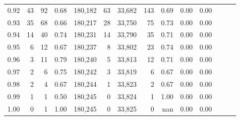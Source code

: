 \begin{tabular}{rrrrrrrrrrrrrr}
0.92 &     43 &   92 &  0.68 &  180,182 &       63 &  33,682 &     143 &  0.69 &  0.00 &      0.00 \\
0.93 &     35 &   68 &  0.66 &  180,217 &       28 &  33,750 &      75 &  0.73 &  0.00 &      0.00 \\
0.94 &     14 &   40 &  0.74 &  180,231 &       14 &  33,790 &      35 &  0.71 &  0.00 &      0.00 \\
0.95 &      6 &   12 &  0.67 &  180,237 &        8 &  33,802 &      23 &  0.74 &  0.00 &      0.00 \\
0.96 &      3 &   11 &  0.79 &  180,240 &        5 &  33,813 &      12 &  0.71 &  0.00 &      0.00 \\
0.97 &      2 &    6 &  0.75 &  180,242 &        3 &  33,819 &       6 &  0.67 &  0.00 &      0.00 \\
0.98 &      2 &    4 &  0.67 &  180,244 &        1 &  33,823 &       2 &  0.67 &  0.00 &      0.00 \\
0.99 &      1 &    1 &  0.50 &  180,245 &        0 &  33,824 &       1 &  1.00 &  0.00 &      0.00 \\
1.00 &      0 &    1 &  1.00 &  180,245 &        0 &  33,825 &       0 &   nan &  0.00 &      0.00 \\
\bottomrule
\end{tabular}
